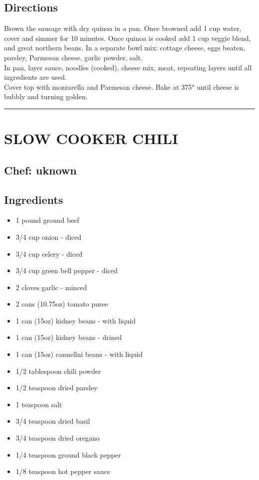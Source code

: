 \documentclass[
]{book}
\providecommand{\tightlist}{%
  \setlength{\itemsep}{0pt}\setlength{\parskip}{0pt}}
\begin{document}
\hypertarget{directions-72}{%
\subsection*{Directions}\label{directions-72}}


Brown the sausage with dry quinoa in a pan. Once browned add 1 cup water,
cover and simmer for 10 minutes. Once quinoa is cooked add 1 cup veggie blend, and great northern beans.
In a separate bowl mix: cottage cheese, eggs beaten, parsley, Parmesan cheese, garlic powder, salt.\\
In pan, layer sauce, noodles (cooked), cheese mix, meat, repeating layers until all ingredients are used.\\
Cover top with mozzarella and Parmesan cheese. Bake at 375° until cheese is bubbly and turning golden.

\begin{center}\rule{0.5\linewidth}{0.5pt}\end{center}

\hypertarget{slow-cooker-chili}{%
\section*{SLOW COOKER CHILI}\label{slow-cooker-chili}}


\hypertarget{chef-uknown}{%
\subsection*{Chef: uknown}\label{chef-uknown}}


\hypertarget{ingredients-73}{%
\subsection*{Ingredients}\label{ingredients-73}}


\begin{itemize}
\tightlist
\item
  1 pound ground beef
\item
  3/4 cup onion - diced
\item
  3/4 cup celery - diced
\item
  3/4 cup green bell pepper - diced
\item
  2 cloves garlic - minced
\item
  2 cans (10.75oz) tomato puree
\item
  1 can (15oz) kidney beans - with liquid
\item
  1 can (15oz) kidney beans - drined
\item
  1 can (15oz) cannellni beans - with liquid
\item
  1/2 tablespoon chili powder
\item
  1/2 teaspoon dried parsley
\item
  1 teaspoon salt
\item
  3/4 teaspoon dried basil
\item
  3/4 teaspoon dried oregano
\item
  1/4 teaspoon ground black pepper
\item
  1/8 teaspoon hot pepper sauce
\end{itemize}
\end{document}
